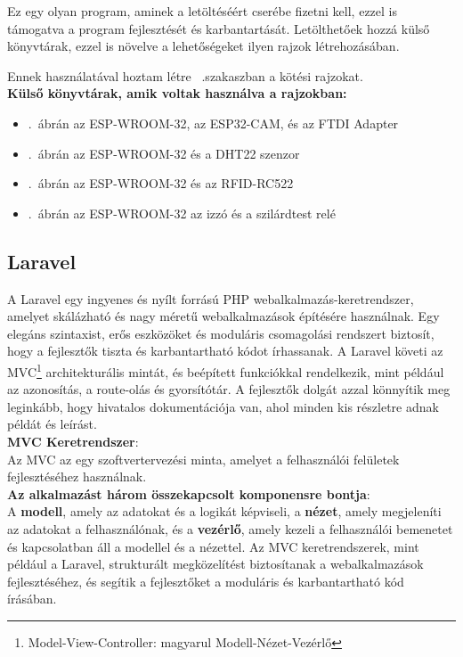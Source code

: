 \documentclass[
]{thesis-ekf}
\theoremstyle{definition}
\theoremstyle{remark}
\begin{document}
	Ez egy olyan program, aminek a letöltéséért cserébe fizetni kell, ezzel is támogatva a program fejlesztését és karbantartását. Letölthetőek hozzá külső könyvtárak, ezzel is növelve a lehetőségeket ilyen rajzok létrehozásában.
	
	Ennek használatával hoztam létre ~.szakaszban a kötési rajzokat.\\
	\textbf{Külső könyvtárak, amik voltak használva a rajzokban:}
	\begin{itemize}
		\item {}.~ábrán az ESP-WROOM-32, az ESP32-CAM, és az FTDI Adapter\cite{fritzing-library}
		\item {}.~ábrán az ESP-WROOM-32 és a DHT22 szenzor \cite{fritzing-library}
		\item {}.~ábrán az ESP-WROOM-32\cite{fritzing-library} és az RFID-RC522\cite{fritzing-rfid}
		\item {}.~ábrán az ESP-WROOM-32\cite{fritzing-library} az izzó\cite{fritzing-light} és a szilárdtest relé\cite{fritzing-SSR}
	\end{itemize}
	\subsection{Laravel}
	A Laravel egy ingyenes és nyílt forrású PHP webalkalmazás-keretrendszer, amelyet skálázható és nagy méretű webalkalmazások építésére használnak. Egy elegáns szintaxist, erős eszközöket és moduláris csomagolási rendszert biztosít, hogy a fejlesztők tiszta és karbantartható kódot írhassanak. A Laravel követi az MVC\footnote{Model-View-Controller: magyarul Modell-Nézet-Vezérlő} architekturális mintát, és beépített funkciókkal rendelkezik, mint például az azonosítás, a route-olás és gyorsítótár.\cite{laravel-intro}
	A fejlesztők dolgát azzal könnyítik meg leginkább, hogy hivatalos dokumentációja van, ahol minden kis részletre adnak példát és leírást.\cite{laravel-docs}\\
	\textbf{MVC Keretrendszer}:\\
	Az MVC az egy szoftvertervezési minta, amelyet a felhasználói felületek fejlesztéséhez használnak. \\
	\textbf{Az alkalmazást három összekapcsolt komponensre bontja}:\\A \textbf{modell}, amely az adatokat és a logikát képviseli, a \textbf{nézet}, amely megjeleníti az adatokat a felhasználónak, és a \textbf{vezérlő}, amely kezeli a felhasználói bemenetet és kapcsolatban áll a modellel és a nézettel. Az MVC keretrendszerek, mint például a Laravel, strukturált megközelítést biztosítanak a webalkalmazások fejlesztéséhez, és segítik a fejlesztőket a moduláris és karbantartható kód írásában.
	
\end{document}
